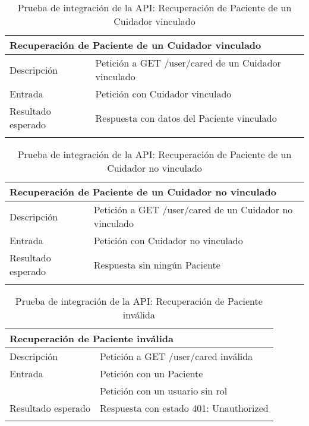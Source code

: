 \vspace{-10pt}
\begin{longtable}{|p{} p{}|}
    \hline
    \multicolumn{2}{|l|}{\textbf{Recuperación de Paciente de un Cuidador vinculado}} \\ \hline 
    Descripción                 & Petición a GET /user/cared de un Cuidador vinculado \\ \hline
    Entrada                     & Petición con Cuidador vinculado \\  \hline
    Resultado esperado          & Respuesta con datos del Paciente vinculado \\ \hline
    \caption{Prueba de integración de la API: Recuperación de Paciente de un Cuidador vinculado}
    \label{cp:i:api:recuperacion_paciente_cuidador_vinculado}
\end{longtable}

\vspace{-10pt}
\begin{longtable}{|p{} p{}|}
    \hline
    \multicolumn{2}{|l|}{\textbf{Recuperación de Paciente de un Cuidador no vinculado}} \\ \hline 
    Descripción                 & Petición a GET /user/cared de un Cuidador no vinculado \\ \hline
    Entrada                     & Petición con Cuidador no vinculado \\  \hline
    Resultado esperado          & Respuesta sin ningún Paciente \\ \hline
    \caption{Prueba de integración de la API: Recuperación de Paciente de un Cuidador no vinculado}
    \label{cp:i:api:recuperacion_paciente_cuidador_no_vinculado}
\end{longtable}

\begin{longtable}{|p{} p{}|}
    \hline
    \multicolumn{2}{|l|}{\textbf{Recuperación de Paciente inválida}} \\ \hline 
    Descripción                 & Petición a GET /user/cared inválida \\ \hline
    Entrada                     & Petición con un Paciente \\
                                & Petición con un usuario sin rol \\ \hline
    Resultado esperado          & Respuesta con estado 401: Unauthorized \\ \hline
    \caption{Prueba de integración de la API: Recuperación de Paciente inválida}
    \label{cp:i:api:recuperacion_paciente_invalida}
\end{longtable}

\vspace{-10pt}